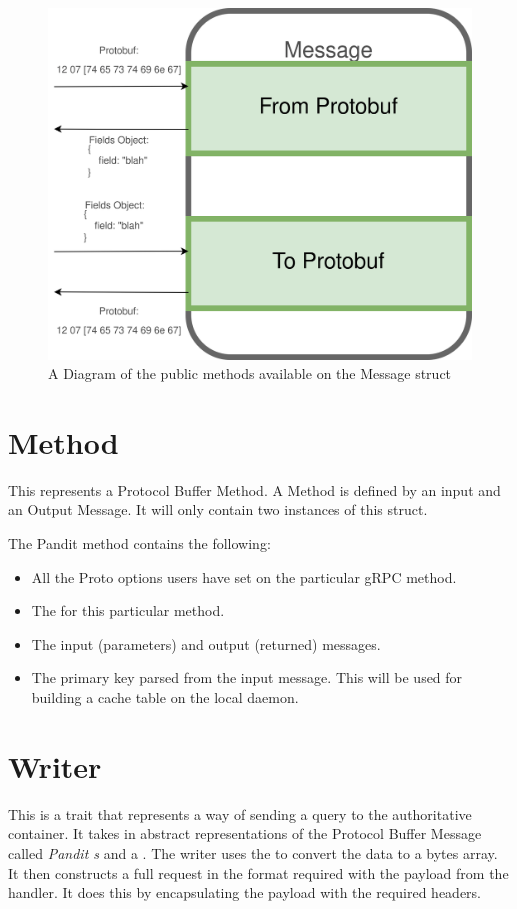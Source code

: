 \documentclass[a4paper,12pt]{report}
\begin{document}
\begin{figure}[hbt!]
    \centering
    \includegraphics[width=\linewidth]{Message.png}
    \caption{A Diagram of the public methods available on the Message struct}
    \label{fig:admin}
\end{figure}

\section{Method}
\label{sec:methods}
This represents a Protocol Buffer Method. A Method is defined by an input  and an Output Message. It will only contain two instances of this struct.

The Pandit method contains the following:

\begin{itemize}
    \item All the Proto options users have set on the particular gRPC method.
    \item The  for this particular method.
    \item The input (parameters) and output (returned) messages.
    \item The primary key parsed from the input message. This will be used for building a cache table on the local daemon.
\end{itemize}

\section{Writer}
\label{sec:writer}
This is a trait \cite{trait} that represents a way of sending a query to the authoritative container.
It takes in abstract representations of the Protocol Buffer Message called \textit{Pandit s} and a \textit{}.
The writer uses the \textit{} to convert the data to a bytes array.
It then constructs a full request in the format required with the payload from the handler. It does this by encapsulating the payload with the required headers.
\end{document}
